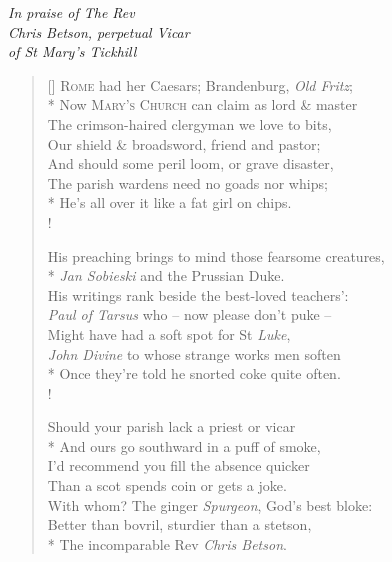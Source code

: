 \begin{center}
{\it In praise of The Rev\\
Chris Betson, perpetual Vicar\\
of St Mary's Tickhill}
\end{center}

\vspace{0.5cm}

\settowidth{\versewidth}{His preaching brings to mind those fearsome creatures,}
\begin{verse}[\versewidth]
\textsc{Rome} had her Caesars; Brandenburg, \textit{Old Fritz};\\*
\vin Now \textsc{Mary's Church} can claim as lord \& master\\
The crimson-haired clergyman we love to bits,\\
\vin Our shield \& broadsword, friend and pastor;\\
\vin And should some peril loom, or grave disaster,\\
The parish wardens need no goads nor whips;\\*
He's all over it like a fat girl on chips.\\!

His preaching brings to mind those fearsome creatures,\\*
\vin \textit{Jan Sobieski} and the Prussian Duke.\\
His writings rank beside the best-loved teachers':\\
\vin \textit{Paul of Tarsus} who -- now please don't puke --\\
\vin Might have had a soft spot for St \textit{Luke},\\
\textit{John Divine} to whose strange works men soften\\*
Once they're told he snorted coke quite often.\\!

Should your parish lack a priest or vicar\\*
\vin And ours go southward in a puff of smoke,\\
I'd recommend you fill the absence quicker\\
\vin Than a scot spends coin or gets a joke.\\
\vin With whom? The ginger \textit{Spurgeon}, God's best bloke:\\
Better than bovril, sturdier than a stetson,\\*
The incomparable Rev \textit{Chris Betson}.
\end{verse}
